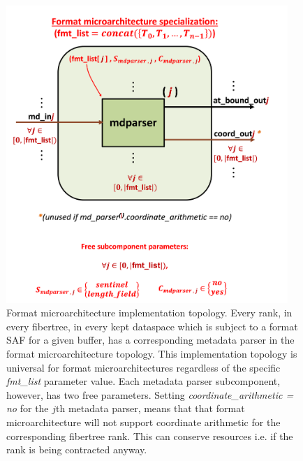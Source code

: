 
\begin{figure}[H]
    \centering
    \includegraphics[width=0.95\textwidth]{figures/FMT_all.png}
    \caption{Format microarchitecture implementation topology. Every rank, in every fibertree, in every kept dataspace which is subject to a format SAF for a given buffer, has a corresponding metadata parser in the format microarchitecture topology. This implementation topology is universal for format microarchitectures regardless of the specific \textit{fmt\_list} parameter value. Each metadata parser subcomponent, however, has two free parameters. Setting \textit{coordinate\_arithmetic = no} for the $j$th metadata parser, means that that format microarchitecture will not support coordinate arithmetic for the corresponding fibertree rank. This can conserve resources i.e. if the rank is being contracted anyway.}
    \label{fig:FMT_all}
\end{figure}

